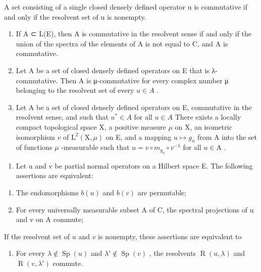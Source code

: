 A set consisting of a single closed densely defined operator u is commutative if and only if the resolvent set of u is nonempty.

\begin{enumerate}
\def\labelenumi{\alph{enumi})}
\item
  If A ⊂ L(E), then A is commutative in the resolvent sense if and only if the union of the spectra of the elements of A is not equal to C, and A is commutative.
\item
  Let A be a set of closed densely defined operators on E that is λ-commutative. Then A is μ-commutative for every complex number μ belonging to the resolvent set of every \(u \in A\) .
\item
  Let A be a set of closed densely defined operators on E, commutative in the resolvent sense, and such that \(u^{*} \in A\) for all \(u \in A\) There exists a locally compact topological space X, a positive measure \(\mu\) on X, an isometric isomorphism \(v\) of \(\mathrm{L}^2 (\mathrm{X},\mu)\) on E, and a mapping \(u\mapsto g_u\) from A into the set of functions \(\mu\) -measurable such that \(u = v\circ m_{g_u}\circ v^{-1}\) for all \(u\in \mathrm{A}\) .
\end{enumerate}

\begin{enumerate}
\def\labelenumi{\arabic{enumi})}
\setcounter{enumi}{7}
\tightlist
\item
  Let u and v be partial normal operators on a Hilbert space E. The following assertions are equivalent:
\end{enumerate}

\begin{enumerate}
\def\labelenumi{\alph{enumi})}
\item
  The endomorphisms \(b(u)\) and \(b(v)\) are permutable;
\item
  For every universally measurable subset A of C, the spectral projections of u and v on A commute;
\end{enumerate}

If the resolvent set of \(u\) and \(v\) is nonempty, these assertions are equivalent to

\begin{enumerate}
\def\labelenumi{\alph{enumi})}
\setcounter{enumi}{2}
\tightlist
\item
  For every \(\lambda \notin \operatorname{Sp}(u)\) and \(\lambda' \notin \operatorname{Sp}(v)\) , the resolvents \(\operatorname{R}(u, \lambda)\) and \(\operatorname{R}(v, \lambda')\) commute.
\end{enumerate}

